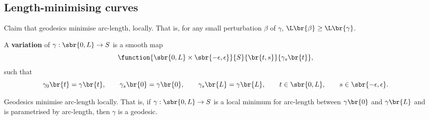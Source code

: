 \pagebreak

\subsection{Length-minimising curves}


Claim that geodesics minimise arc-length, locally. That is, for any small perturbation $ \beta $ of $ \gamma $, $ \L\br{\beta} \ge \L\br{\gamma} $.

\begin{definition}
A \textbf{variation} of $ \gamma : \sbr{0, L} \to S $ is a smooth map
$$ \function{\sbr{0, L} \times \sbr{-\epsilon, \epsilon}}{S}{\br{t, s}}{\gamma_s\br{t}}, $$
such that
$$ \gamma_0\br{t} = \gamma\br{t}, \qquad \gamma_s\br{0} = \gamma\br{0}, \qquad \gamma_s\br{L} = \gamma\br{L}, \qquad t \in \sbr{0, L}, \qquad s \in \sbr{-\epsilon, \epsilon}. $$
\end{definition}

\begin{proposition}
Geodesics minimise arc-length locally. That is, if $ \gamma : \sbr{0, L} \to S $ is a local minimum for arc-length between $ \gamma\br{0} $ and $ \gamma\br{L} $ and is parametrised by arc-length, then $ \gamma $ is a geodesic.
\end{proposition}

